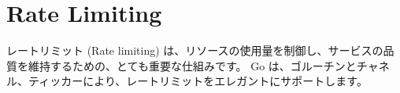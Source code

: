 \section{Rate Limiting}

レートリミット (Rate limiting) は、リソースの使用量を制御し、サービスの品質を維持するための、とても重要な仕組みです。 Go は、ゴルーチンとチャネル、ティッカーにより、レートリミットをエレガントにサポートします。




